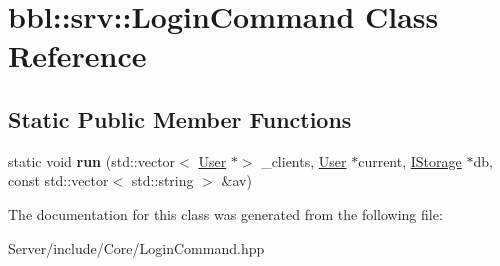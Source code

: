 \hypertarget{classbbl_1_1srv_1_1_login_command}{}\section{bbl\+:\+:srv\+:\+:Login\+Command Class Reference}
\label{classbbl_1_1srv_1_1_login_command}
\subsection*{Static Public Member Functions}
\begin{DoxyCompactItemize}
\item 
\mbox{\label{classbbl_1_1srv_1_1_login_command_a8ea3bc8b736cab226924094181d83bd0}} 
static void {\bfseries run} (std\+::vector$<$ \hyperlink{classbbl_1_1srv_1_1_user}{User} $\ast$$>$ \+\_\+clients, \hyperlink{classbbl_1_1srv_1_1_user}{User} $\ast$current, \hyperlink{classbbl_1_1srv_1_1_i_storage}{I\+Storage} $\ast$db, const std\+::vector$<$ std\+::string $>$ \&av)
\end{DoxyCompactItemize}


The documentation for this class was generated from the following file\+:\begin{DoxyCompactItemize}
\item 
Server/include/\+Core/Login\+Command.\+hpp\end{DoxyCompactItemize}
